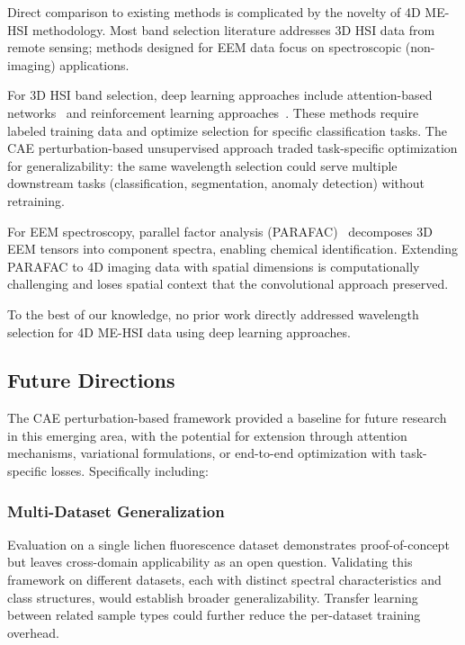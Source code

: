 Direct comparison to existing methods is complicated by the novelty of 4D ME-HSI methodology.
Most band selection literature addresses 3D HSI data from remote sensing; methods designed for EEM data focus on spectroscopic (non-imaging) applications.

For 3D HSI band selection, deep learning approaches include attention-based networks~\cite{mou2017deep} and reinforcement learning approaches~\cite{roy2020hybridsn}.
These methods require labeled training data and optimize selection for specific classification tasks.
The CAE perturbation-based unsupervised approach traded task-specific optimization for generalizability: the same wavelength selection could serve multiple downstream tasks (classification, segmentation, anomaly detection) without retraining.

For EEM spectroscopy, parallel factor analysis (PARAFAC)~\cite{bro1997parafac} decomposes 3D EEM tensors into component spectra, enabling chemical identification.
Extending PARAFAC to 4D imaging data with spatial dimensions is computationally challenging and loses spatial context that the convolutional approach preserved.

To the best of our knowledge, no prior work directly addressed wavelength selection for 4D ME-HSI data using deep learning approaches.


\subsection{Future Directions}
\label{sec:future_work}

The CAE perturbation-based framework provided a baseline for future research in this emerging area, with the potential for extension through attention mechanisms, variational formulations, or end-to-end optimization with task-specific losses. Specifically including: 
\subsubsection{Multi-Dataset Generalization}
Evaluation on a single lichen fluorescence dataset demonstrates
proof-of-concept but leaves cross-domain applicability as an open question.
Validating this framework on different datasets, each with distinct spectral
characteristics and class structures, would establish broader
generalizability. Transfer learning between related sample types could
further reduce the per-dataset training overhead.

